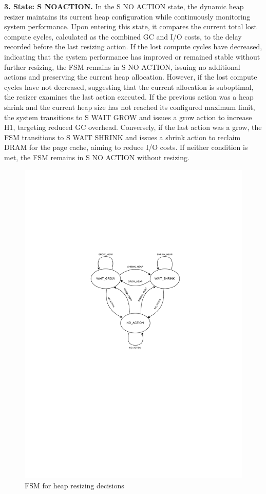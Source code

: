 \textbf{3. State: S NOACTION.} In the S NO ACTION state, the dynamic heap
resizer maintains its current heap configuration while continuously monitoring
system performance. Upon entering this state, it compares the current total lost
compute cycles, calculated as the combined GC and I/O costs, to the delay
recorded before the last resizing action. If the lost compute cycles have
decreased, indicating that the system performance has improved or remained
stable without further resizing, the FSM remains in S NO ACTION, issuing no
additional actions and preserving the current heap allocation. However, if the
lost compute cycles have not decreased, suggesting that the current allocation
is suboptimal, the resizer examines the last action executed. If the previous
action was a heap shrink and the current heap size has not reached its
configured maximum limit, the system transitions to S WAIT GROW and issues a
grow action to increase H1, targeting reduced GC overhead. Conversely, if the
last action was a grow, the FSM transitions to S WAIT SHRINK and issues a shrink
action to reclaim DRAM for the page cache, aiming to reduce I/O costs. 
If neither condition is met, the FSM remains in S NO ACTION without resizing.


\begin{figure}[htbp]
  \centering
\includegraphics[width=1.1\columnwidth]{fig/FSM.pdf}
  \caption{FSM for heap resizing decisions}
  \label{fig:fsm}
\end{figure}

